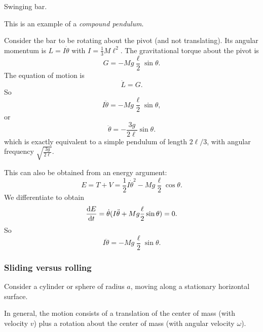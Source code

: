 \begin{example}
  Swinging bar.
  \begin{center}
  \end{center}
  This is an example of a \emph{compound pendulum}.

  Consider the bar to be rotating about the pivot (and not translating). Its angular momentum is $L = I\dot{\theta}$ with $I = \frac{1}{3}M\ell^2$. The gravitational torque about the pivot is
  \[
    G = - Mg\frac{\ell}{2} \sin \theta.
  \]
  The equation of motion is
  \[
    \dot{L} = G.
  \]
  So
  \[
    I\ddot{\theta} = -Mg \frac{\ell}{2}\sin \theta,
  \]
  or
  \[
    \ddot{\theta} = -\frac{3g}{2\ell} \sin \theta.
  \]
  which is exactly equivalent to a simple pendulum of length $2\ell/3$, with angular frequency $\sqrt{\frac{3g}{2\ell}}$.

  This can also be obtained from an energy argument:
  \[
    E = T + V = \frac{1}{2}I\dot{\theta}^2 - Mg\frac{\ell}{2}\cos\theta.
  \]
  We differentiate to obtain
  \[
    \frac{\mathrm{d} E}{\mathrm{d} t} = \dot{\theta}(I\ddot{\theta} + Mg \frac{\ell}{2}\sin \theta) = 0.
  \]
  So
  \[
    I\ddot{\theta} = -Mg \frac{\ell}{2}\sin \theta.
  \]
\end{example}

\subsubsection*{Sliding versus rolling}
Consider a cylinder or sphere of radius $a$, moving along a stationary horizontal surface.
\begin{center}
\end{center}
In general, the motion consists of a translation of the center of mass (with velocity $v$) plus a rotation about the center of mass (with angular velocity $\omega$).

